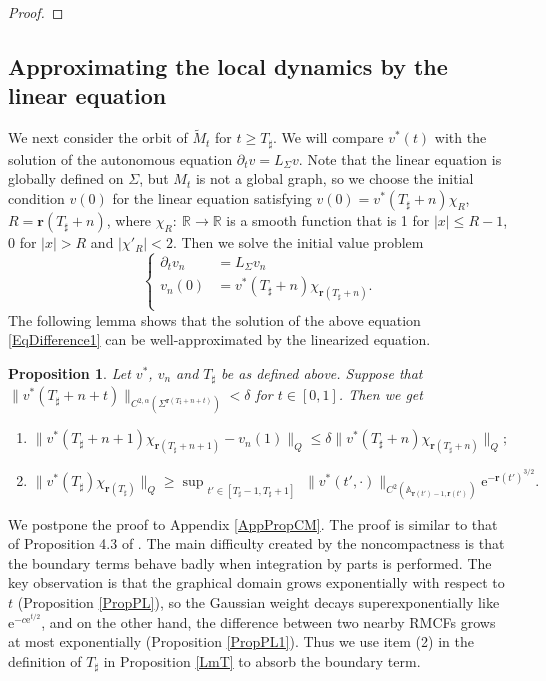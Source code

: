 \documentclass[12pt]{amsart}
\numberwithin{equation}{section}
\newtheorem{proposition}[theorem]{Proposition}
\numberwithin{equation}{section}
\newcommand{\dt}{\delta}
\newcommand{\al}{\alpha}
\newcommand{\R}{\mathbb{R}}
\begin{document}
\begin{proof}
		
	\end{proof}
	
	\subsection{Approximating the local dynamics by the linear equation}\label{SSApproximate}
	We next consider the orbit of $\widetilde M_t$ for $t\geq T_\sharp$.  We will compare $v^*(t)$ with the solution of the autonomous equation $\partial_t v= L_\Sigma v$. Note that the linear equation is globally defined on $\Sigma$, but $M_t$ is not a global graph, so we choose the initial condition $v(0)$ for the linear equation satisfying $v(0)=v^*(T_\sharp+n)\chi_R$, $R=\mathbf r({T_\sharp+n})$, where $\chi_R:\ \R\to \R$ is a smooth function that is 1 for $|x|\leq R-1$, $0$ for $|x|>R$ and $|\chi'_R|<2$. Then we solve the initial value problem
	\begin{equation}\label{EqLinearAuto}
		\begin{cases}
			\partial_t v_n&= L_\Sigma v_n\\
			v_n(0)&=v^*(T_\sharp+n)\chi_{\mathbf r({T_\sharp+n})}.\\
		\end{cases}
	\end{equation}
	The following lemma shows that the solution of the above equation \eqref{EqDifference1} can be well-approximated by the linearized equation. 
	
	\begin{proposition}\label{LmCM3}
		Let $v^*$, $v_n$ and $T_\sharp$ be as defined above. Suppose that $\|v^*(T_\sharp+n+t)\|_{C^{2,\al}(\Sigma^{\mathbf r({T_\sharp+n+t})})}<\dt $ for $t\in [0,1]$. Then we get 
		\begin{enumerate}
			\item $\|v^*(T_\sharp+n+1)\chi_{\mathbf r({T_\sharp+n+1})}-v_n(1)\|_{Q}\leq \dt\|v^*(T_\sharp+n)\chi_{\mathbf r({T_\sharp+n})}\|_{Q};$
			\item $\displaystyle\|v^*(T_\sharp)\chi_{\mathbf{r}({T_\sharp})}\|_Q\geq  \sup_{\substack{ t'\in[T_{\sharp}-1,T_{\sharp}+1]}}
			\|v^*(t',\cdot)\|_{C^2(\mathbb A_{\mathbf r({t'})-1,\mathbf r({t'})})} \mathrm{e}^{-{\mathbf r({t'})^{3/2}}}. $
		\end{enumerate}
		
	\end{proposition}
	We postpone the proof to Appendix \ref{AppPropCM}. The proof is similar to that of Proposition 4.3 of \cite{CM2}. The main difficulty created by the noncompactness is that the boundary terms behave badly when integration by parts is performed. The key observation is that the graphical domain grows exponentially with respect to $t$ (Proposition \ref{PropPL}), so the Gaussian weight decays superexponentially like $\mathrm{e}^{-c\mathrm{e}^{t/2}}$, and on the other hand, the difference between two nearby RMCFs grows at most exponentially (Proposition \ref{PropPL1}). Thus we use item (2) in the definition of $T_\sharp$ in Proposition \ref{LmT} to absorb the boundary term. 
\end{document}
